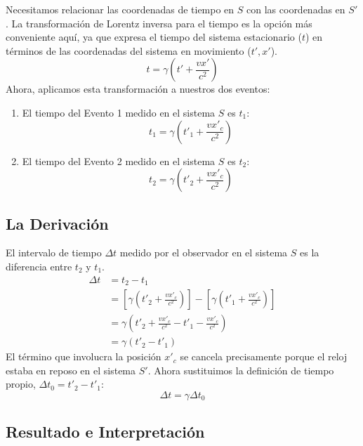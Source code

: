 \documentclass[11pt,a4paper]{article}
\begin{document}
Necesitamos relacionar las coordenadas de tiempo en $S$ con las coordenadas en $S'$. La transformación de Lorentz inversa para el tiempo es la opción más conveniente aquí, ya que expresa el tiempo del sistema estacionario ($t$) en términos de las coordenadas del sistema en movimiento ($t', x'$).
\[ t = \gamma \left( t' + \frac{vx'}{c^2} \right) \]
Ahora, aplicamos esta transformación a nuestros dos eventos:
\begin{enumerate}
    \item El tiempo del Evento 1 medido en el sistema $S$ es $t_1$:
    \[ t_1 = \gamma \left( t'_1 + \frac{vx'_c}{c^2} \right) \]
    \item El tiempo del Evento 2 medido en el sistema $S$ es $t_2$:
    \[ t_2 = \gamma \left( t'_2 + \frac{vx'_c}{c^2} \right) \]
\end{enumerate}

\subsection{La Derivación}

El intervalo de tiempo $\Delta t$ medido por el observador en el sistema $S$ es la diferencia entre $t_2$ y $t_1$.
\begin{align*}
\Delta t &= t_2 - t_1 \\
&= \left[ \gamma \left( t'_2 + \frac{vx'_c}{c^2} \right) \right] - \left[ \gamma \left( t'_1 + \frac{vx'_c}{c^2} \right) \right] \\
&= \gamma \left( t'_2 + \frac{vx'_c}{c^2} - t'_1 - \frac{vx'_c}{c^2} \right) \\
&= \gamma (t'_2 - t'_1)
\end{align*}
El término que involucra la posición $x'_c$ se cancela precisamente porque el reloj estaba en reposo en el sistema $S'$. Ahora sustituimos la definición de tiempo propio, $\Delta t_0 = t'_2 - t'_1$:
\[ \Delta t = \gamma \Delta t_0 \]

\subsection{Resultado e Interpretación}
\end{document}
